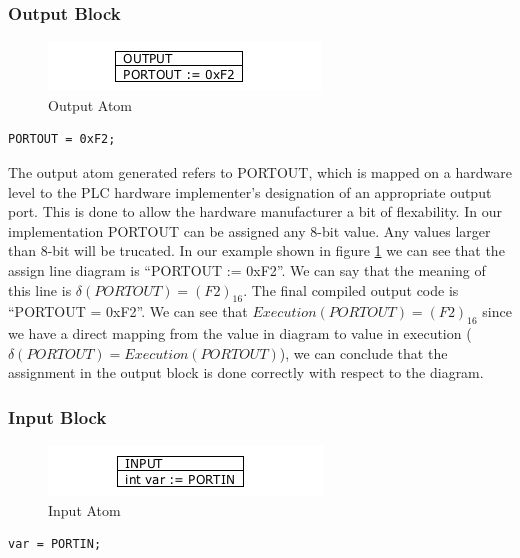 \subsubsection{Output Block}

\begin{figure}[h]
	\centering
	\includegraphics[width=\imgmedphoto]{./images/correctness_atom_output.png}
	\caption{Output Atom}
	\label{fig:correctness_atom_output}
\end{figure}

\begin{lstlisting}[frame=single]
PORTOUT = 0xF2;
\end{lstlisting}

The output atom generated refers to PORTOUT, which is mapped on a hardware level to the PLC hardware implementer's designation of an appropriate output port. This is done to allow the hardware manufacturer a bit of flexability. In our implementation PORTOUT can be assigned any 8-bit value. Any values larger than 8-bit will be trucated. In our example shown in figure \ref{fig:correctness_atom_output} we can see that the assign line diagram is ``PORTOUT := 0xF2''. We can say that the meaning of this line is $\delta(PORTOUT) = (F2)_{16}$. The final compiled output code is ``PORTOUT = 0xF2''. We can see that $Execution(PORTOUT) = (F2)_{16}$ since we have a direct mapping from the value in diagram to value in execution ($\delta(PORTOUT) = Execution(PORTOUT)$), we can conclude that the assignment in the output block is done correctly with respect to the diagram.


\subsubsection{Input Block}

\begin{figure}[h]
	\centering
	\includegraphics[width=\imgmedphoto]{./images/correctness_atom_input.png}
	\caption{Input Atom}
	\label{fig:correctness_atom_input}
\end{figure}

\begin{lstlisting}[frame=single]
var = PORTIN;
\end{lstlisting}


